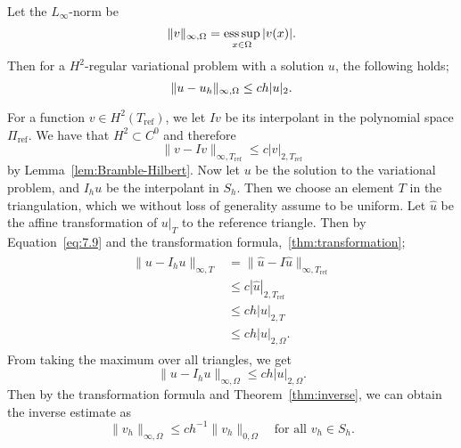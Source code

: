 \begin{thmx}{\quad\label{thm:max_error}}
    Let the $L_\infty$-norm be 
    \begin{equation*}
        \|v\|_{\infty, \Omega} = \operatorname*{ess\,sup}_{x\in\Omega} |v(x)|.
    \end{equation*}
    Then 
    for a $H^2$-regular variational problem with a solution $u$, the following holds;
    \begin{equation}
        \|u-u_h\|_{\infty, \Omega}\leq ch|u|_2.
    \end{equation}
\end{thmx}
\begin{bev}
    For a function $v\in H^2(T_{\text{ref}})$, we let $Iv$ be its interpolant in the polynomial space $\Pi_{\text{ref}}$.
    We have that $H^2\subset C^0$ and therefore 
    \begin{equation}
        \|v-Iv\|_{\infty,T_\text{ref}} \leq c|v|_{2,T_\text{ref}}
        \label{eq:7.9}
    \end{equation}
    by Lemma~\ref{lem:Bramble-Hilbert}.
    Now let $u$ be the solution to the variational problem, and $I_h u$ be the interpolant in $S_h$.
    Then we choose an element $T$ in the triangulation, which we without loss of generality assume to be uniform. 
    Let $\hat{u}$ be the affine transformation of $u|_T$ to the reference triangle.
    Then by Equation~\ref{eq:7.9} and the transformation formula,~\ref{thm:transformation};
    \begin{align}
        \begin{split}
            \|u-I_h u\|_{\infty,T} &= \|\hat{u} - I\hat{u}\|_{\infty,T_{\text{ref}}} \\
            &\leq c|\hat{u}|_{2,T_{\text{ref}}} \\
            &\leq ch|u|_{2,T} \\
            &\leq ch|u|_{2,\Omega}.
        \end{split}
    \end{align}
    From taking the maximum over all triangles, we get
    \begin{equation}
        \|u - I_h u \|_{\infty,\Omega} \leq ch|u|_{2,\Omega}.
        \label{eq:7.10}
    \end{equation}
    Then by the transformation formula and Theorem~\ref{thm:inverse}, we can obtain the inverse estimate as
    \begin{equation}
        \|v_h\|_{\infty,\Omega} \leq ch^{-1} \|v_h\|_{0,\Omega} \quad \text{for all } v_h\in S_h.
    \end{equation}

\end{bev}
